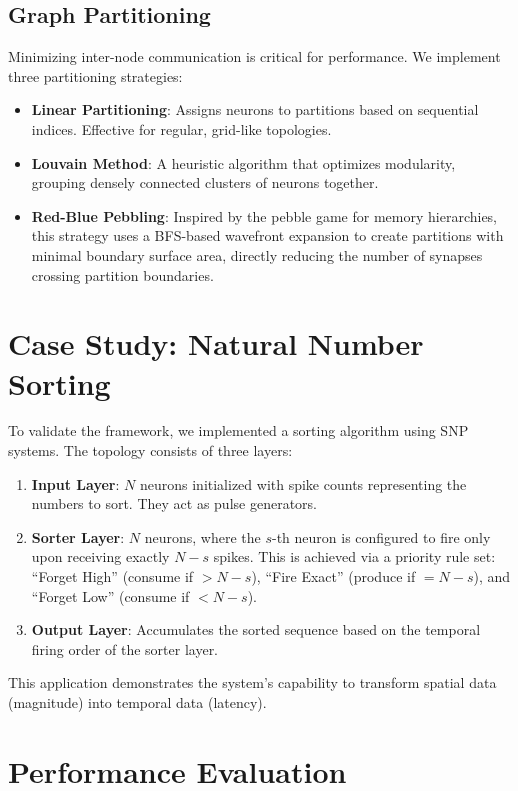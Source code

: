 \documentclass[11pt, a4paper]{article}
\begin{document}
\subsection{Graph Partitioning}
Minimizing inter-node communication is critical for performance. We implement three partitioning strategies:
\begin{itemize}
    \item \textbf{Linear Partitioning}: Assigns neurons to partitions based on sequential indices. Effective for regular, grid-like topologies.
    \item \textbf{Louvain Method}: A heuristic algorithm that optimizes modularity, grouping densely connected clusters of neurons together.
    \item \textbf{Red-Blue Pebbling}: Inspired by the pebble game for memory hierarchies, this strategy uses a BFS-based wavefront expansion to create partitions with minimal boundary surface area, directly reducing the number of synapses crossing partition boundaries.
\end{itemize}

\section{Case Study: Natural Number Sorting}

To validate the framework, we implemented a sorting algorithm using SNP systems. The topology consists of three layers:
\begin{enumerate}
    \item \textbf{Input Layer}: $N$ neurons initialized with spike counts representing the numbers to sort. They act as pulse generators.
    \item \textbf{Sorter Layer}: $N$ neurons, where the $s$-th neuron is configured to fire only upon receiving exactly $N-s$ spikes. This is achieved via a priority rule set: ``Forget High'' (consume if $> N-s$), ``Fire Exact'' (produce if $= N-s$), and ``Forget Low'' (consume if $< N-s$).
    \item \textbf{Output Layer}: Accumulates the sorted sequence based on the temporal firing order of the sorter layer.
\end{enumerate}
This application demonstrates the system's capability to transform spatial data (magnitude) into temporal data (latency).

\section{Performance Evaluation}
\end{document}
